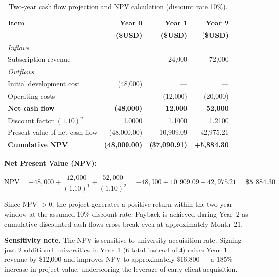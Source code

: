 \documentclass[12pt, a4paper]{article}
\begin{document}
\begin{table}[H]
\centering
\renewcommand{\arraystretch}{1.3}
\begin{tabular}{p{5.5cm} r r r}
\toprule
\textbf{Item} & \textbf{Year 0} & \textbf{Year 1} & \textbf{Year 2} \\
              & \textbf{(\$USD)} & \textbf{(\$USD)} & \textbf{(\$USD)} \\
\midrule
\textit{Inflows} & & & \\
\quad Subscription revenue        & ---     & 24,000  & 72,000  \\
\midrule
\textit{Outflows} & & & \\
\quad Initial development cost    & (48,000) & ---    & ---     \\
\quad Operating costs             & ---      & (12,000) & (20,000) \\
\midrule
\textbf{Net cash flow}            & \textbf{(48,000)} & \textbf{12,000} & \textbf{52,000} \\
\midrule
Discount factor $(1.10)^{n}$      & 1.0000  & 1.1000  & 1.2100  \\
Present value of net cash flow    & (48,000.00) & 10,909.09 & 42,975.21 \\
\midrule
\textbf{Cumulative NPV}           & \textbf{(48,000.00)} & \textbf{(37,090.91)} & \textbf{+5,884.30} \\
\bottomrule
\end{tabular}
\caption{Two-year cash flow projection and NPV calculation (discount rate 10\%).}
\end{table}

\textbf{Net Present Value (NPV):}

\[
\text{NPV} = -48{,}000 + \frac{12{,}000}{(1.10)^{1}} + \frac{52{,}000}{(1.10)^{2}}
= -48{,}000 + 10{,}909.09 + 42{,}975.21 = \mathbf{\$5{,}884.30}
\]

Since NPV $> 0$, the project generates a positive return within the two-year window at
the assumed 10\% discount rate. Payback is achieved during Year~2 as cumulative
discounted cash flows cross break-even at approximately Month~21.

\textbf{Sensitivity note.} The NPV is sensitive to university acquisition rate.
Signing just 2 additional universities in Year~1 (6 total instead of 4) raises
Year~1 revenue by \$12,000 and improves NPV to approximately \$16,800 --- a 185\%
increase in project value, underscoring the leverage of early client acquisition.

\end{document}
